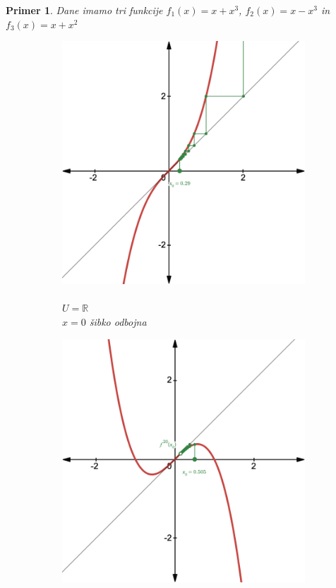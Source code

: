 \documentclass{article}
\newtheorem{primer}{Primer}
\newcommand{\R}{\mathbb{R}}
\begin{document}
\newpage
\begin{primer}
Dane imamo tri funkcije $f_1(x) = x + x^3$, $f_2(x) = x - x^3$ in 
$f_3(x) = x + x^2$ 
    \begin{figure}[h]
        \centering
        \begin{subfigure}[b]{0.3\textwidth}
            \centering
            \includegraphics[width=\textwidth]{Grafi/cobweb41.png}
            \caption{\\$U = \R$\\$x=0$ šibko odbojna}
            \label{fig:cobweb31}
        \end{subfigure}
        \begin{subfigure}[b]{0.3\textwidth}
            \centering
            \includegraphics[width=\textwidth]{Grafi/cobweb42.png}

\end{subfigure}
\end{figure}
\end{primer}
\end{document}
